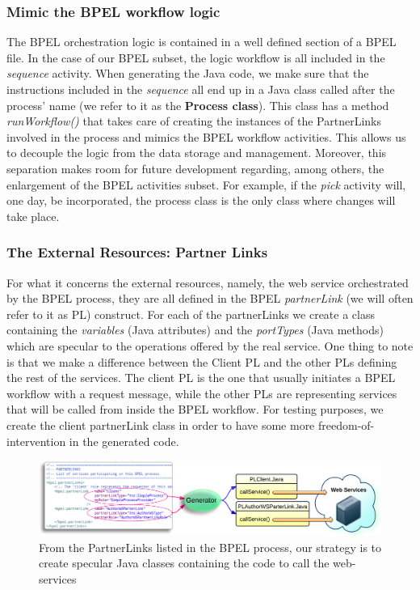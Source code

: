 \subsubsection{Mimic the BPEL workflow logic}
\label{mimicBPELLogic}
The BPEL orchestration logic is contained in a well defined section of a BPEL file. In the case of our BPEL subset, the logic workflow is all included in the \textit{sequence} activity. When generating the Java code, we make sure that the instructions included in the \textit{sequence} all end up in a Java class called after the process' name (we refer to it as the \textbf{Process class}). This class has a method \textit{runWorkflow()} that takes care of creating the instances of the PartnerLinks involved in the process and mimics the BPEL workflow activities.  
This allows us to decouple the logic from the data storage and management. Moreover, this separation makes room for future development regarding, among others, the enlargement of the BPEL activities subset. For example, if the \textit{pick} activity will, one day, be incorporated, the process class is the only class where changes will take place.

\subsubsection{The External Resources: Partner Links}
\label{sec:extrenalResources}
For what it concerns the external resources, namely, the web service orchestrated by the BPEL process, they are all defined in the BPEL \textit{partnerLink} (we will often refer to it as PL) construct. For each of the partnerLinks we create a class containing the \textit{variables} (Java attributes) and the \textit{portTypes} (Java methods) which are specular to the operations offered by the real service.
One thing to note is that we make a difference between the Client PL and the other PLs defining the rest of the services. The client PL is the one that usually initiates a BPEL workflow with a request message, while the other PLs are representing services that will be called from inside the BPEL workflow. For testing purposes, we create the client partnerLink class in order to have some more freedom-of-intervention in the generated code.

\begin{figure}
  \begin{center}
    \includegraphics[scale=0.9]{pictures/PLTranslation.png}
    \caption{From the PartnerLinks listed in the BPEL process, our strategy is to create specular Java classes containing the code to call the web-services}
    \label{fig:PLTranslation}
  \end{center}
\end{figure} 


